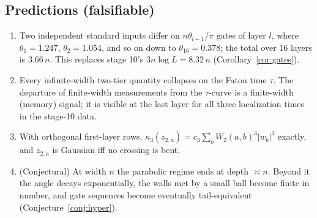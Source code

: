 \subsection{Predictions (falsifiable)}
\begin{enumerate}[leftmargin=*]
\item Two independent standard inputs differ on $n\theta_{l-1}/\pi$ gates of layer $l$, where $\theta_1=1.247$, $\theta_2=1.054$, and so on down to
$\theta_{16}=0.378$; the total over $16$ layers is $3.66\,n$. This replaces stage 10's $3n\log L=8.32\,n$ (Corollary~\ref{cor:gates}).
\item Every infinite-width two-tier quantity collapses on the Fatou time $\tau$. The departure of finite-width measurements from the
$\tau$-curve is a finite-width (memory) signal; it is visible at the last layer for all three localization times in the stage-10 data.
\item With orthogonal first-layer rows, $\kappa_3(z_{2,a})=c_3\sum_bW_2(a,b)^3|w_b|^3$ exactly, and $z_{2,a}$ is Gaussian iff no crossing is bent.
\item (Conjectural) At width $n$ the parabolic regime ends at depth $\asymp n$. Beyond it the angle decays exponentially, the walls met by a
small ball become finite in number, and gate sequences become eventually tail-equivalent (Conjecture~\ref{conj:hyper}).
\end{enumerate}

